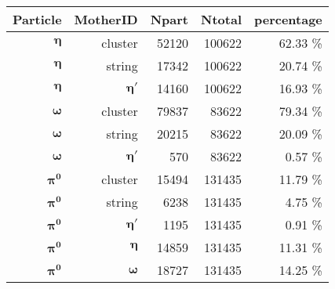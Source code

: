 \documentclass[10pt,a4paper]{article}
\begin{document}
\begin{tabular}[ht]{ |r |r |r |r |r |}
\hline
Particle & MotherID & Npart & Ntotal & percentage \\\hline
\hline
$\bm{\eta}$ & cluster & 52120 & 100622 & 62.33 \% \\\hline
$\bm{\eta}$  & string & 17342 & 100622 & 20.74 \% \\\hline
$\bm{\eta}$  & $\bm{\eta '}$ & 14160 & 100622 & 16.93 \% \\\hline
$\bm{\omega}$  & cluster & 79837 & 83622 & 79.34 \% \\\hline
$\bm{\omega}$  & string & 20215 & 83622 & 20.09 \% \\\hline
$\bm{\omega}$ & $\bm{\eta '}$ & 570 & 83622 & 0.57 \% \\\hline
$\bm{\pi^0}$ & cluster & 15494 & 131435 & 11.79 \% \\\hline
$\bm{\pi^0}$ & string & 6238 & 131435 & 4.75 \% \\\hline
$\bm{\pi^0}$ & $\bm{\eta '}$ & 1195 & 131435 & 0.91 \% \\\hline
$\bm{\pi^0}$ & $\bm{\eta}$ & 14859 & 131435 & 11.31 \%\\\hline
$\bm{\pi^0}$ & $\bm{\omega}$ & 18727 & 131435 & 14.25 \%\\\hline

\end{tabular}
\end{document}
